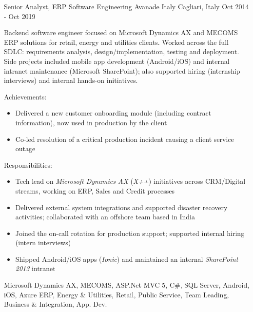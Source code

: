 \begin{cventries}
	\cventryextendedwithdoubletags
    	{Senior Analyst, ERP Software Engineering} %
    	{Avanade Italy } %
    	{Cagliari, Italy} %
    	{Oct 2014 - Oct 2019} %
    	{
			\begin{cvitem}
			Backend software engineer focused on Microsoft Dynamics AX and MECOMS ERP solutions for retail, energy and utilities clients.
			Worked across the full SDLC: requirements analysis, design/implementation, testing and deployment.
			Side projects included mobile app development (Android/iOS) and internal intranet maintenance (Microsoft SharePoint); also supported hiring (internship interviews) and internal hands-on initiatives.
			\end{cvitem}
		}
    	{
			\begin{cvitems}
			\item Achievements:
				\begin{itemize}
					\item Delivered a new customer onboarding module (including contract information), now used in production by the client
					\item Co-led resolution of a critical production incident causing a client service outage
				\end{itemize}
			\item Responsibilities:
				\begin{itemize}
					\item Tech lead on \textit{Microsoft Dynamics AX} (\textit{X++}) initiatives across CRM/Digital streams, working on ERP, Sales and Credit processes
					\item Delivered external system integrations and supported disaster recovery activities; collaborated with an offshore team based in India
					\item Joined the on-call rotation for production support; supported internal hiring (intern interviews)
					\item Shipped Android/iOS apps (\textit{Ionic}) and maintained an internal \textit{SharePoint 2013} intranet
				\end{itemize}
			\end{cvitems}
    	}
		{Microsoft Dynamics AX, MECOMS, ASP.Net MVC 5, C\#, SQL Server, Android, iOS, Azure}
        {ERP, Energy \& Utilities, Retail, Public Service, Team Leading, Business \& Integration, App. Dev.}  
    

\end{cventries}
